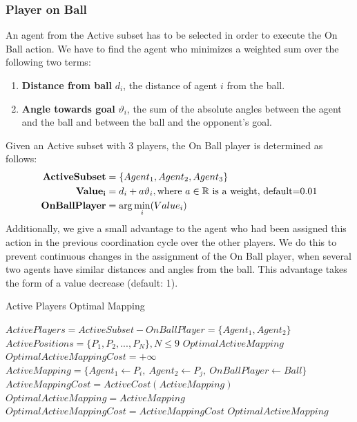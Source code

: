 \subsubsection*{Player on Ball}
An agent from the Active subset has to be selected in order to execute the On Ball action. We have to find the agent who minimizes a weighted sum over the following two terms:
\begin{enumerate}
\item \textbf{Distance from ball} $d_{i}$, the distance of agent $i$ from the ball. 
\item \textbf{Angle towards goal} $\vartheta_{i}$, the sum of the absolute angles between the agent and the ball and between the ball and the opponent's goal.
\end{enumerate}
Given an Active subset with 3 players, the On Ball player is determined as follows:
\begin{align*}
{\bf ActiveSubset} &= \lbrace Agent_{1},Agent_{2},Agent_{3} \rbrace  \\
{\bf Value_{i}} &= d_{i} + a \vartheta_{i}, \text{where $a\in\mathbb{R}$ is a weight, default=$0.01$} \\
{\bf OnBallPlayer} &= \arg\min_{i}(Value_{i})
\end{align*}
Additionally, we give a small advantage to the agent who had been assigned this action in the previous coordination cycle over the other players. We do this to prevent continuous changes in the assignment of the On Ball player, when several two agents have similar distances and angles from the ball. This advantage takes the form of a value decrease (default: 1).


\begin{algorithm}[t!]
\caption{Active Players Optimal Mapping}
\label{ActiveMapping}
\begin{algorithmic}[1]
$ActivePlayers = ActiveSubset - OnBallPlayer = \{Agent_1,Agent_2\}$
$ActivePositions = \lbrace P_{1},P_{2},...,P_{N} \rbrace, N\leq 9 $
 $Optimal Active Mapping$
\STATE 
\STATE $OptimalActiveMappingCost = +\infty$
\STATE $ActiveMapping = \{Agent_1 \leftarrow P_i,\ Agent_2 \leftarrow P_j,\ OnBallPlayer \leftarrow Ball\}$
\STATE $ActiveMappingCost = ActiveCost(ActiveMapping)$
\STATE $OptimalActiveMapping = ActiveMapping$
\STATE $OptimalActiveMappingCost = ActiveMappingCost$
\ENDIF
\ENDFOR
\RETURN $OptimalActiveMapping$
\end{algorithmic}
\end{algorithm}




